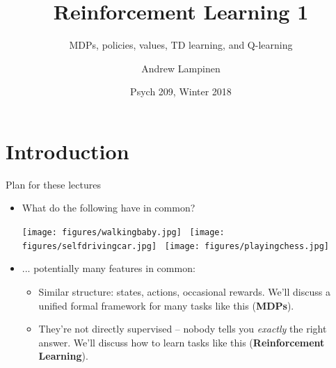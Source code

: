\documentclass[handout]{beamer} %
\begin{document}
\title{Reinforcement Learning 1}
\subtitle{MDPs, policies, values, TD learning, and Q-learning}
\author{Andrew Lampinen}
\date{Psych 209, Winter 2018}
\frame{\titlepage}


\section{Introduction}
\begin{frame}{Plan for these lectures}
\begin{itemize}
    \item What do the following have in common?
    \begin{center}
        \texttt{[image: figures/walkingbaby.jpg]}~
        \texttt{[image: figures/selfdrivingcar.jpg]}~
        \texttt{[image: figures/playingchess.jpg]}
    \end{center}
    \item<2-> ... potentially many features in common:
    \begin{itemize} 
        \item<3-> Similar structure: states, actions, occasional rewards. We'll discuss a unified formal framework for many tasks like this (\textbf{MDPs}). 
        \item<4-> They're not directly supervised -- nobody tells you \emph{exactly} the right answer. We'll discuss how to learn tasks like this (\textbf{Reinforcement Learning}). 
    \end{itemize}
\end{itemize}
\end{frame}
\end{document}
